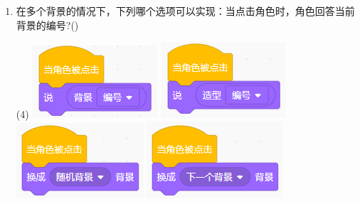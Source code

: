 \documentclass[10pt, a4paper]{article}
\begin{document}
\begin{enumerate}
        \item 在多个背景的情况下，下列哪个选项可以实现：当点击角色时，角色回答当前背景的编号?(\qquad)
        \begin{tasks}(4)
            \task \includegraphics[width=.15\textwidth]{22a.png}
            \task \includegraphics[width=.15\textwidth]{22b.png}
            \task \includegraphics[width=.15\textwidth]{22c.png}
            \task \includegraphics[width=.15\textwidth]{22d.png}
        \end{tasks}


\end{enumerate}
\end{document}
